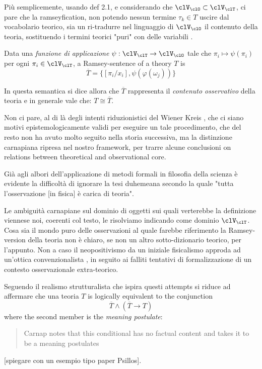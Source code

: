 Più semplicemente, usando def 2.1, e considerando che $\clV_\clO \subset \clV_\clT$, ci pare che la ramseyfication, non potendo nessun termine $\tau_k \in T$ uscire dal vocabolario teorico, sia un ri-tradurre nel linguaggio di $\clV_\clO$ il contenuto della teoria, sostituendo i termini teorici "puri" con delle variabili \cite{?}.
\begin{definition}
	Data una \emph{funzione di applicazione} $\psi: \clV_\clT \to \clV_\clO$ tale che $\pi_i \mapsto \psi (\pi_i) $ per ogni $\pi_i \in \clV_\clT$, a Ramsey-sentence of a theory $T$ is 
	\[ \overline{T} = \{[\pi_i/x_i], \psi (\varphi (\omega_j))\} 
	\]
\end{definition}



In questa semantica si dice allora che $\overline{T}$ rappresenta il \emph{contenuto osservativo} della teoria e in generale vale che: $T \cong \overline{T}$. 



Non ci pare, al di là degli intenti riduzionistici del Wiener Kreis \cite{Weinb}, che ci siano motivi epistemologicamente validi per eseguire un tale procedimento, che del resto non ha avuto molto seguito nella storia successiva, ma la distinzione carnapiana ripresa nel nostro framework, per trarre alcune conclusioni on relations between theoretical and observational core.

Già agli albori dell'applicazione di metodi formali in filosofia della scienza è evidente la difficoltà di ignorare la tesi duhemeana secondo la quale "tutta l'osservazione [in fisica] è carica di teoria". 

Le ambiguità carnapiane sul dominio di oggetti sui quali verterebbe la definizione viennese noi, coerenti col testo, le risolviamo indicando come dominio $\clV_\clT$. Cosa sia il mondo puro delle osservazioni al quale farebbe riferimento la Ramsey-version della teoria non è chiaro, se non un altro sotto-dizionario teorico, per l'appunto. Non a caso il neopositivismo da un iniziale fisicalismo approda ad un'ottica convenzionalista \cite{?}, in seguito ai falliti tentativi di formalizzazione di un contesto osservazionale extra-teorico. 

Seguendo \cite{psillos} il realismo strutturalista che ispira questi attempts si riduce ad affermare che una teoria $T$ is logically equivalent to the conjunction
\[\overline{T} \land (\overline{T} \rightarrow T)
\] where the second member is the \emph{meaning postulate}:
\begin{quotation}
	Carnap notes that this conditional has no factual content and takes it to be a meaning postulates \cite{psillos}
\end{quotation}
[spiegare con un esempio tipo paper Psillos].

